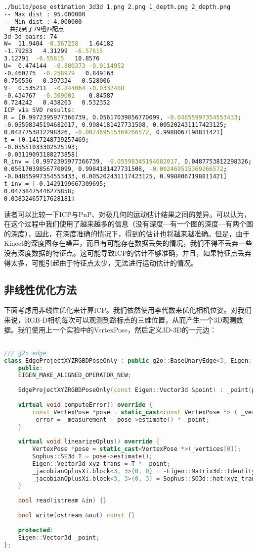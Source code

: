 \begin{lstlisting}[language=sh,caption=终端输入：]
./build/pose_estimation_3d3d 1.png 2.png 1_depth.png 2_depth.png
-- Max dist : 95.000000 
-- Min dist : 4.000000 
一共找到了79组匹配点
3d-3d pairs: 74
W=  11.9404 -0.567258   1.64182
-1.79283   4.31299  -6.57615
3.12791  -6.55815   10.8576
U=  0.474144  -0.880373 -0.0114952
-0.460275  -0.258979   0.849163
0.750556   0.397334   0.528006
V=  0.535211  -0.844064 -0.0332488
-0.434767  -0.309001    0.84587
0.724242   0.438263   0.532352
ICP via SVD results: 
R = [0.9972395977366739, 0.05617039856770099, -0.04855997354553433;
-0.05598345194682017, 0.9984181427731508, 0.005202431117423125;
0.0487753812298326, -0.002469515369266572, 0.9988067198811421]
t = [0.1417248739257469;
-0.05551033302525193;
-0.03119093188273858]
R_inv = [0.9972395977366739, -0.05598345194682017, 0.0487753812298326;
0.05617039856770099, 0.9984181427731508, -0.002469515369266572;
-0.04855997354553433, 0.005202431117423125, 0.9988067198811421]
t_inv = [-0.1429199667309695;
0.04738475446275858;
0.03832465717628181]
\end{lstlisting}

读者可以比较一下ICP与PnP、对极几何的运动估计结果之间的差异。可以认为，在这个过程中我们使用了越来越多的信息（没有深度—有一个图的深度—有两个图的深度），因此，在深度准确的情况下，得到的估计也将越来越准确。但是，由于Kinect的深度图存在噪声，而且有可能存在数据丢失的情况，我们不得不丢弃一些没有深度数据的特征点。这可能导致ICP的估计不够准确，并且，如果特征点丢弃得太多，可能引起由于特征点太少，无法进行运动估计的情况。

\subsection{非线性优化方法}
下面考虑用非线性优化来计算ICP。我们依然使用李代数来优化相机位姿。对我们来说，RGB-D相机每次可以观测到路标点的三维位置，从而产生一个3D观测数据。我们使用上一个实验中的VertexPose，然后定义3D-3D的一元边：
\begin{lstlisting}[language=c++,caption=slambook2/ch7/pose\_estimation\_3d3d.cpp]

/// g2o edge
class EdgeProjectXYZRGBDPoseOnly : public g2o::BaseUnaryEdge<3, Eigen::Vector3d, VertexPose> {
	public:
	EIGEN_MAKE_ALIGNED_OPERATOR_NEW;
	
	EdgeProjectXYZRGBDPoseOnly(const Eigen::Vector3d &point) : _point(point) {}
	
	virtual void computeError() override {
		const VertexPose *pose = static_cast<const VertexPose *> ( _vertices[0] );
		_error = _measurement - pose->estimate() * _point;
	}
	
	virtual void linearizeOplus() override {
		VertexPose *pose = static_cast<VertexPose *>(_vertices[0]);
		Sophus::SE3d T = pose->estimate();
		Eigen::Vector3d xyz_trans = T * _point;
		_jacobianOplusXi.block<3, 3>(0, 0) = -Eigen::Matrix3d::Identity();
		_jacobianOplusXi.block<3, 3>(0, 3) = Sophus::SO3d::hat(xyz_trans);
	}
	
	bool read(istream &in) {}
	
	bool write(ostream &out) const {}
	
	protected:
	Eigen::Vector3d _point;
};
\end{lstlisting}

